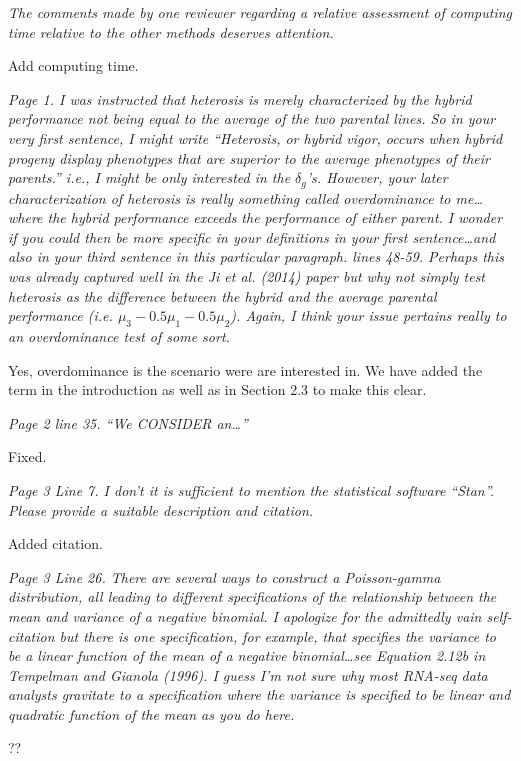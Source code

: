 \documentclass{article}
\newcommand{\comment}[1]{\textit{#1}}
\newcommand{\response}[1]{#1}
\newcommand{\todo}[1]{{\color{red} #1}}
\begin{document}
\comment{The comments made by one reviewer regarding a relative assessment of computing time relative to the other methods deserves attention.}

\todo{Add computing time.}

\comment{Page 1.  I was instructed that heterosis is merely characterized by the hybrid performance not being equal to the average of the two parental lines.  So in your very first sentence, I might write “Heterosis, or hybrid vigor, occurs when hybrid progeny display phenotypes that are superior to the average phenotypes of their parents.” i.e., I might be only interested in the $\delta_g$’s. However, your later characterization of heterosis is really something called overdominance to me…where the hybrid performance exceeds the performance of either parent.  I wonder if you could then be more specific in your definitions in your first sentence…and also in your third sentence in this particular paragraph. lines 48-59.  Perhaps this was already captured well in the Ji et al. (2014) paper but why not simply test heterosis as the difference between the hybrid and the average parental performance (i.e. $\mu_3 - 0.5 \mu_1 - 0.5 \mu_2$).  Again, I think your issue pertains really to an overdominance test of some sort.}

\response{Yes, overdominance is the scenario were are interested in. We have added the term in the introduction as well as in Section 2.3 to make this clear.}

\comment{Page 2 line 35.  “We CONSIDER an…”}

\response{Fixed.}

\comment{Page 3 Line 7.  I don’t it is sufficient to mention the statistical software “Stan”.  Please provide a suitable description and citation.}

\response{Added citation.}

\comment{Page 3 Line 26.  There are several ways to construct a Poisson-gamma distribution, all leading to different specifications of the relationship between the mean and variance of a negative binomial.  I apologize for the admittedly vain self-citation but there is one specification, for example, that specifies the variance to be a linear function of the mean of a negative binomial…see Equation 2.12b in  Tempelman and Gianola (1996).  I guess I’m not sure why most RNA-seq data analysts gravitate to a specification where the variance is specified to be linear and quadratic function of the mean as you do here.}

\todo{??}
\end{document}
